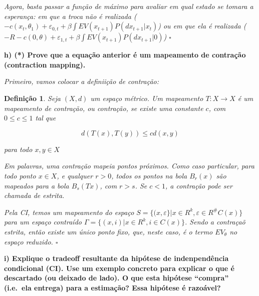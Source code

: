 \documentclass[12pt,a4paper]{article}
\newtheorem{definition}{Definição}
\begin{document}
\emph{Agora, basta passar a função de máximo para avaliar em qual estado
se tomara a esperança: em que a troca não é realizada
(\(-c(x_t,\theta_1)+\varepsilon_{0,t} + \beta \int EV(x_{t+1})P(dx_{t+1}|x_t)\))
ou em que ela é realizada
(\(-R -c(0,\theta) + \varepsilon_{1,t} + \beta \int EV(x_{t+1})P(dx_{t+1}|0)\))
\(\square\)}

\textbf{h) (*) Prove que a equação anterior é um mapeamento de contração
(contraction mapping).}

\emph{Primeiro, vamos colocar a definiição de contração:}

\begin{definition}
Seja $(X,d)$ um espaço métrico. Um mapeamento $T:X \rightarrow X$ é um mapeamento de contração, ou contração, se existe uma constante $c$, com $0 \leq c \leq 1$ tal que  

\[
d(T(x),T(y)) \leq cd(x,y)
\]

para todo $x,y \in X$

\end{definition}

\emph{Em palavras, uma contração mapeia pontos próximos. Como caso
particular, para todo ponto \(x \in X\), e qualquer \(r>0\), todos os
pontos na bola \(B_r(x)\) são mapeados para a bola \(B_s(Tx)\), com
\(r > s\). Se \(c < 1\), a contração pode ser chamada de estrita.}

\emph{Pela CI, temos um mapeamento do espaço
\(S=\{(x,\varepsilon\}|x \in R^k, \varepsilon \in R^\#C(x)\}\) para um
espaço contraído \(\Gamma=\{(x,i)|x \in R^k, i \in C(x)\}\). Sendo a
contraçaõ estrita, então existe um único ponto fixo, que, neste caso, é
o termo \(EV_\theta\) no espaço reduzido. \(\square\)}

\textbf{i) Explique o tradeoff resultante da hipótese de indenpendência
condicional (CI). Use um exemplo concreto para explicar o que é
descartado (ou deixado de lado). O que esta hipótese ``compra''
(i.e.~ela entrega) para a estimação? Essa hipótese é razoável?}
\end{document}
